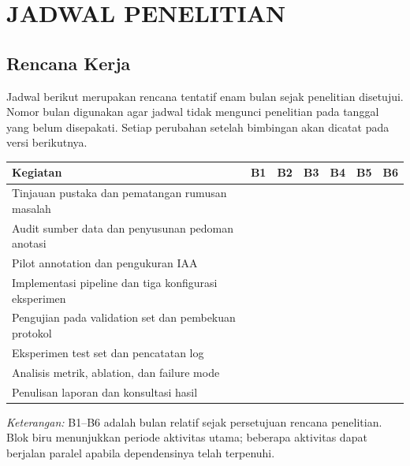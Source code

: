 \chapter{JADWAL PENELITIAN}

\section{Rencana Kerja}

Jadwal berikut merupakan rencana tentatif enam bulan sejak penelitian disetujui. Nomor bulan digunakan agar jadwal tidak mengunci penelitian pada tanggal yang belum disepakati. Setiap perubahan setelah bimbingan akan dicatat pada versi berikutnya.

\begin{table}[htbp]
\centering
\renewcommand{\arraystretch}{1.25}
\setlength{\tabcolsep}{4pt}
\newcommand{\taskbar}{\cellcolor{blue!30}}
\begin{tabular}{|p{5.2cm}|c|c|c|c|c|c|}
\hline
\textbf{Kegiatan} & \textbf{B1} & \textbf{B2} & \textbf{B3} & \textbf{B4} & \textbf{B5} & \textbf{B6} \\
\hline
Tinjauan pustaka dan pematangan rumusan masalah & \taskbar & \taskbar & & & & \\
\hline
Audit sumber data dan penyusunan pedoman anotasi & \taskbar & \taskbar & & & & \\
\hline
Pilot annotation dan pengukuran IAA & & \taskbar & \taskbar & & & \\
\hline
Implementasi pipeline dan tiga konfigurasi eksperimen & & \taskbar & \taskbar & \taskbar & & \\
\hline
Pengujian pada validation set dan pembekuan protokol & & & \taskbar & \taskbar & & \\
\hline
Eksperimen test set dan pencatatan log & & & & \taskbar & \taskbar & \\
\hline
Analisis metrik, ablation, dan failure mode & & & & & \taskbar & \taskbar \\
\hline
Penulisan laporan dan konsultasi hasil & & & & & \taskbar & \taskbar \\
\hline
\end{tabular}
\end{table}

\noindent\textit{Keterangan:} B1--B6 adalah bulan relatif sejak persetujuan rencana penelitian. Blok biru menunjukkan periode aktivitas utama; beberapa aktivitas dapat berjalan paralel apabila dependensinya telah terpenuhi.
